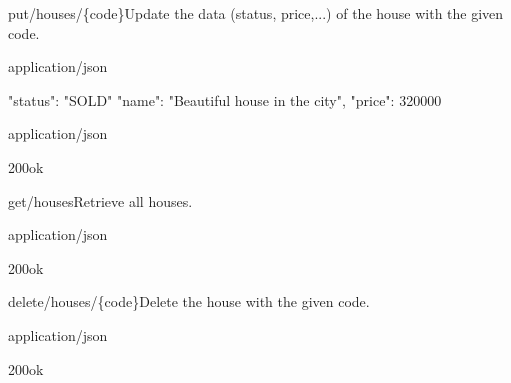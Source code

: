 \begin{oefening}
\begin{apiRoute}{put}{/houses/\{code\}}{Update the data (status, price,...) of the house with the given code.}
\begin{routeParameter}
\end{routeParameter}
\begin{routeRequest}{application/json}
\begin{routeRequestBody}
{
  "status": "SOLD"
  "name": "Beautiful house in the city",
  "price": 320000
}
\end{routeRequestBody}
\end{routeRequest}
\begin{routeResponse}{application/json}
\begin{routeResponseItem}{200}{ok}
\end{routeResponseItem}
\end{routeResponse}
\end{apiRoute}

\begin{apiRoute}{get}{/houses}{Retrieve all houses.}
\begin{routeParameter}
\end{routeParameter}
\begin{routeResponse}{application/json}
\begin{routeResponseItem}{200}{ok}
\begin{routeResponseItemBody}
\end{routeResponseItemBody}
\end{routeResponseItem}
\end{routeResponse}
\end{apiRoute}

\begin{apiRoute}{delete}{/houses/\{code\}}{Delete the house with the given code.}
\begin{routeParameter}
\end{routeParameter}
\begin{routeResponse}{application/json}
\begin{routeResponseItem}{200}{ok}
\end{routeResponseItem}
\end{routeResponse}
\end{apiRoute}

\end{oefening}